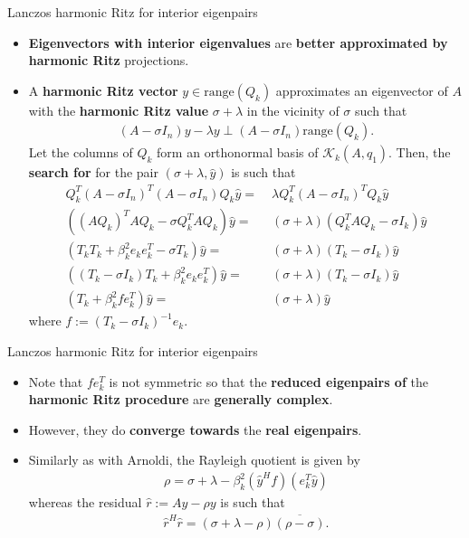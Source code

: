 \documentclass[t,usepdftitle=false]{beamer}
\begin{document}
\begin{frame}{Lanczos harmonic Ritz for interior eigenpairs}
\begin{itemize}
\item \textbf{Eigenvectors with interior eigenvalues} are \textbf{better approximated by harmonic Ritz} projections.
\item A \textbf{harmonic Ritz vector} $y\in\text{range}(Q_k)$ approximates an eigenvector of $A$ with the \textbf{harmonic Ritz value} $\sigma+\lambda$ in the vicinity of $\sigma$ such that\vspace{-.1cm}
\begin{align*}
(A-\sigma I_n)y-\lambda y\perp (A-\sigma I_n)\text{range}(Q_k).
\end{align*}
Let the columns of $Q_k$ form an orthonormal basis of $\mathcal{K}_k(A,q_1)$.
Then, the \textbf{search for} for the pair $(\sigma+\lambda,\hat{y})$ is such that
\begin{align*}
Q_k^T(A-\sigma I_n)^T(A-\sigma I_n)Q_k\hat{y}=&\;\lambda Q_k^T(A-\sigma I_n)^TQ_k\hat{y}\\
((AQ_k)^TAQ_k-\sigma Q_k^TAQ_k)\hat{y}=&\;(\sigma+\lambda)(Q_k^TAQ_k-\sigma I_k)\hat{y}\\
(T_kT_k+\beta_k^2e_ke_k^T-\sigma T_k)\hat{y}=&\;(\sigma+\lambda)(T_k-\sigma I_k)\hat{y}\\
((T_k-\sigma I_k)T_k+\beta_k^2e_ke_k^T)\hat{y}=&\;(\sigma+\lambda)(T_k-\sigma I_k)\hat{y}\\
(T_k+\beta_k^2fe_k^T)\hat{y}=&\;(\sigma+\lambda)\hat{y}
\end{align*}
where $f:=(T_k-\sigma I_k)^{-1}e_k$.
\end{itemize}
\end{frame}

\begin{frame}{Lanczos harmonic Ritz for interior eigenpairs}
\begin{itemize}
\item Note that $fe_k^T$ is not symmetric so that the \textbf{reduced eigenpairs of} the \textbf{harmonic Ritz procedure} are \textbf{generally complex}.
\item[] However, they do \textbf{converge towards} the \textbf{real eigenpairs}.
\item Similarly as with Arnoldi, the Rayleigh quotient is given by
\begin{align*}
\rho=\sigma+\lambda-\beta_{k}^2(\hat{y}^Hf)(e_k^T\hat{y})
\end{align*}
whereas the residual $\hat{r}:=Ay-\rho y$ is such that 
\begin{align*}
\hat{r}^H\hat{r}=(\sigma+\lambda-\rho)\overline{(\rho-\sigma)}.
\end{align*}
\end{itemize}
\end{frame}
\end{document}
